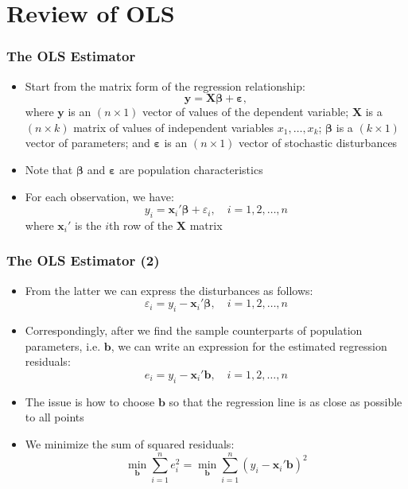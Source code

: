\documentclass[10pt]{beamer}
\theoremstyle{definition}
\begin{document}
\section{Review of OLS}
\begin{frame}[fragile]
\frametitle{The OLS Estimator}
\begin{itemize}
	\item Start from the matrix form of the regression relationship:
	\[
		\mathbf{y} = \mathbf{X}\bm\beta + \bm\varepsilon,
	\]
	where $\mathbf{y}$ is an $(n\times 1)$ vector of values of the dependent variable; $\mathbf{X}$ is a $(n \times k)$ matrix of values of independent variables $x_{1}, \ldots, x_{k}$; $\bm \beta$ is a $(k \times 1)$ vector of parameters; and $\bm\varepsilon$ is an $(n\times 1)$ vector of stochastic disturbances
	\item Note that $\bm \beta$ and $\bm\varepsilon$ are population characteristics
	\item For each observation, we have:
	\[
		y_{i} = \mathbf{x}_{i}'\bm\beta + \varepsilon_{i}, \quad i = 1, 2, \ldots, n
	\]
	where $\mathbf{x}_{i}'$ is the $i$th row of the $\mathbf{X}$ matrix
\end{itemize}
\end{frame}

\begin{frame}[fragile]
\frametitle{The OLS Estimator (2)}
\begin{itemize}
	\item From the latter we can express the disturbances as follows:
	\[
		\varepsilon_{i} = y_{i} - \mathbf{x}_{i}'\bm\beta , \quad i = 1, 2, \ldots, n
	\]
	\item Correspondingly, after we find the sample counterparts of population parameters, i.e. $\textbf{b}$, we can write an expression for the estimated regression residuals:
	\[
		e_{i} = y_{i} - \mathbf{x}_{i}'\mathbf{b} , \quad i = 1, 2, \ldots, n
	\]
	\item The issue is how to choose $\mathbf{b}$ so that the regression line is as close as possible to all points
	\item We minimize the sum of squared residuals:
	\[
		\underset{\mathbf{b}}{\min}\sum_{i=1}^{n}e_{i}^{2} = \underset{\mathbf{b}}{\min}\sum_{i=1}^{n}(y_{i} - \mathbf{x}_{i}'\mathbf{b})^{2}
	\]
\end{itemize}
\end{frame}
\end{document}
